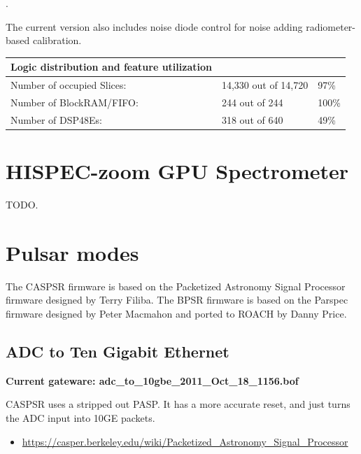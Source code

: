 \documentclass[letterpaper,10pt,english]{sphinxmanual}
\begin{document}
.

The current version also includes noise diode control for noise adding radiometer-based
calibration.

\begin{tabulary}{\linewidth}{|L|L|L|}
\hline
\textbf{\relax 
Logic distribution and feature utilization
} & \textbf{\relax } & \textbf{\relax }\\\hline

Number of occupied Slices:
 & 
14,330 out of  14,720
 & 
97\%
\\\hline

Number of BlockRAM/FIFO:
 & 
244 out of     244
 & 
100\%
\\\hline

Number of DSP48Es:
 & 
318 out of     640
 & 
49\%
\\\hline
\end{tabulary}



\section{HISPEC-zoom GPU Spectrometer}
\label{gateware:hispec-zoom-gpu-spectrometer}
TODO.


\section{Pulsar modes}
\label{gateware:pulsar-modes}
The CASPSR firmware is based on the Packetized Astronomy Signal Processor
firmware designed by Terry Filiba. The BPSR firmware is based on the Parspec
firmware designed by Peter Macmahon and ported to ROACH by Danny Price.


\subsection{ADC to Ten Gigabit Ethernet}
\label{gateware:adc-to-ten-gigabit-ethernet}
\textbf{Current gateware: adc\_to\_10gbe\_2011\_Oct\_18\_1156.bof}

CASPSR uses a stripped out PASP. It has a more accurate reset, and just turns the ADC input
into 10GE packets.
\begin{itemize}
\item {} 
\href{https://casper.berkeley.edu/wiki/Packetized\_Astronomy\_Signal\_Processor}{https://casper.berkeley.edu/wiki/Packetized\_Astronomy\_Signal\_Processor}

\end{itemize}
\end{document}
